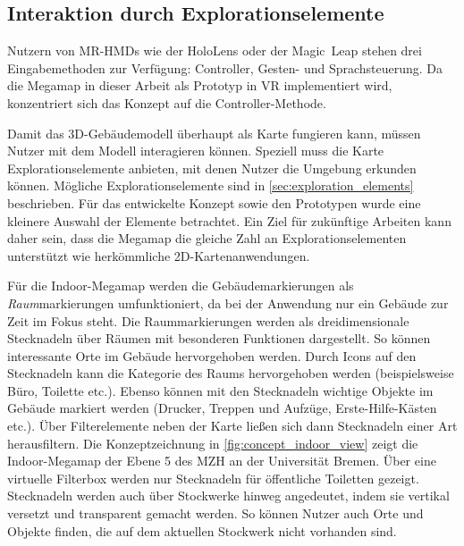 \subsection{Interaktion durch Explorationselemente}
Nutzern von MR-HMDs wie der HoloLens oder der Magic~Leap stehen drei Eingabemethoden zur Verfügung: Controller, Gesten- und Sprachsteuerung.
Da die Megamap in dieser Arbeit als Prototyp in VR implementiert wird, konzentriert sich das Konzept auf die Controller-Methode.

Damit das 3D-Gebäudemodell überhaupt als Karte fungieren kann, müssen Nutzer mit dem Modell interagieren können.
Speziell muss die Karte Explorationselemente anbieten, mit denen Nutzer die Umgebung erkunden können.
Mögliche Explorationselemente sind in \autoref{sec:exploration_elements} beschrieben.
Für das entwickelte Konzept sowie den Prototypen wurde eine kleinere Auswahl der Elemente betrachtet.
Ein Ziel für zukünftige Arbeiten kann daher sein, dass die Megamap die gleiche Zahl an Explorationselementen unterstützt wie herkömmliche 2D-Kartenanwendungen.

Für die Indoor-Megamap werden die Gebäudemarkierungen als \emph{Raum}markierungen umfunktioniert, da bei der Anwendung nur ein Gebäude zur Zeit im Fokus steht.
Die Raummarkierungen werden als dreidimensionale Stecknadeln über Räumen mit besonderen Funktionen dargestellt.
So können interessante Orte im Gebäude hervorgehoben werden.
Durch Icons auf den Stecknadeln kann die Kategorie des Raums hervorgehoben werden (beispielsweise Büro, Toilette etc.).
Ebenso können mit den Stecknadeln wichtige Objekte im Gebäude markiert werden (Drucker, Treppen und Aufzüge, Erste-Hilfe-Kästen etc.).
Über Filterelemente neben der Karte ließen sich dann Stecknadeln einer Art herausfiltern.
Die Konzeptzeichnung in \autoref{fig:concept_indoor_view} zeigt die Indoor-Megamap der Ebene 5 des MZH an der Universität Bremen.
Über eine virtuelle Filterbox werden nur Stecknadeln für öffentliche Toiletten gezeigt.
Stecknadeln werden auch über Stockwerke hinweg angedeutet, indem sie vertikal versetzt und transparent gemacht werden.
So können Nutzer auch Orte und Objekte finden, die auf dem aktuellen Stockwerk nicht vorhanden sind.

